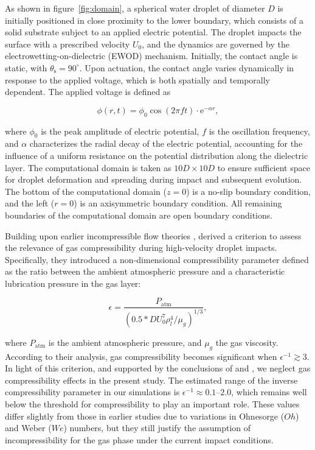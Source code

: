 \documentclass[lineno]{cls/jfm}
\begin{document}
 As shown in figure~\ref{fig:domain}, a spherical water droplet of diameter $D$ is initially positioned in close proximity to the lower boundary, which consists of a solid substrate subject to an applied electric potential. The droplet impacts the surface with a prescribed velocity $U_0$, and the dynamics are governed by the electrowetting-on-dielectric (EWOD) mechanism. Initially, the contact angle is static, with $\theta_{\mathrm{s}} = 90^\circ$. Upon actuation, the contact angle varies dynamically in response to the applied voltage, which is both spatially and temporally dependent. The applied voltage is defined as

\begin{equation}
  \phi(r,t) = \phi_0 \cos(2\pi f t) \cdot \mathrm{e}^{- \alpha r},
  \label{dynamic electric potential}
\end{equation}

\noindent where $\phi_0$ is the peak amplitude of electric potential, $f$ is the oscillation frequency, and $\alpha$ characterizes the radial decay of the electric potential, accounting for the influence of a uniform resistance on the potential distribution along the dielectric layer. The computational domain is taken as $10D \times 10D$ to ensure sufficient space for droplet deformation and spreading during impact and subsequent evolution. The bottom of the computational domain ($z = 0$) is a no-slip boundary condition, and the left ($r = 0$) is an axisymmetric boundary condition. All remaining boundaries of the computational domain are open boundary conditions.

Building upon earlier incompressible flow theories \citep{smith_air_2003, korobkin_trapping_2008}, \citet{mandre_precursors_2009} derived a criterion to assess the relevance of gas compressibility during high-velocity droplet impacts. Specifically, they introduced a non-dimensional compressibility parameter defined as the ratio between the ambient atmospheric pressure and a characteristic lubrication pressure in the gas layer:

\begin{equation}
  \epsilon = \frac{P_{\mathrm{atm}}}{\left(0.5 * D U_0^7 \rho_l^4 / \mu_g \right)^{1/3}},
  \label{compressibility equation}
\end{equation}

\noindent where $P_{\mathrm{atm}}$ is the ambient atmospheric pressure, and $\mu_g$ the gas viscosity. According to their analysis, gas compressibility becomes significant when $\epsilon^{-1} \gtrsim 3$. In light of this criterion, and supported by the conclusions of \citet{li_time-resolved_2015} and \citet{mandre_precursors_2009}, we neglect gas compressibility effects in the present study. The estimated range of the inverse compressibility parameter in our simulations is $\epsilon^{-1} \approx 0.1 \text{--} 2.0$, which remains well below the threshold for compressibility to play an important role. These values differ slightly from those in earlier studies due to variations in Ohnesorge ($Oh$) and Weber ($We$) numbers, but they still justify the assumption of incompressibility for the gas phase under the current impact conditions.
\end{document}
